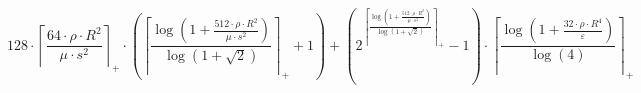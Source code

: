 \[128 \cdot \left\lceil \frac{64 \cdot \rho \cdot R^{2}}{\mu \cdot s^{2}} \right\rceil_{+} \cdot \left(\left\lceil \frac{\log\left(1 + \frac{512 \cdot \rho \cdot R^{2}}{\mu \cdot s^{2}}\right)}{\log\left(1 + \sqrt{2}\right)} \right\rceil_{+} + 1\right) + \left(2^{\left\lceil \frac{\log\left(1 + \frac{512 \cdot \rho \cdot R^{2}}{\mu \cdot s^{2}}\right)}{\log\left(1 + \sqrt{2}\right)} \right\rceil_{+}} - 1\right) \cdot \left\lceil \frac{\log\left(1 + \frac{32 \cdot \rho \cdot R^{4}}{\varepsilon}\right)}{\log\left(4\right)} \right\rceil_{+}\]
